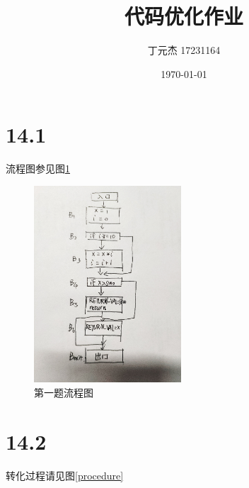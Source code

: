 \documentclass[UTF8]{ctexart}
\title{代码优化作业}
\author{丁元杰 17231164}
\date{\today}
\begin{document}
\maketitle


\section*{14.1}

流程图参见图\ref{sequence1}

\begin{figure}[htbp]
    \centering
        \includegraphics[width=5.5cm]{seqaq-small.png}
    \caption{第一题流程图}
    \label{sequence1}
\end{figure}

\section*{14.2}

转化过程请见图\ref{procedure}
\end{document}
